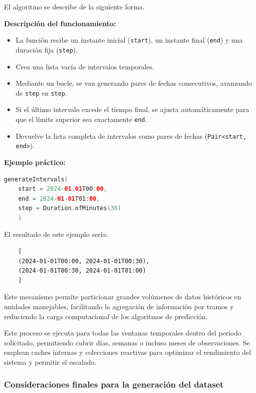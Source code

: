 El algoritmo se describe de la siguiente forma.

\vspace{1em}
\noindent \textbf{Descripción del funcionamiento:}
\begin{itemize}
	\item La función recibe un instante inicial (\texttt{start}), un instante final (\texttt{end}) y una duración fija (\texttt{step}).
	\item Crea una lista vacía de intervalos temporales.
	\item Mediante un bucle, se van generando pares de fechas consecutivos, avanzando de \texttt{step} en \texttt{step}.
	\item Si el último intervalo excede el tiempo final, se ajusta automáticamente para que el límite superior sea exactamente \texttt{end}.
	\item Devuelve la lista completa de intervalos como pares de fechas (\texttt{Pair<start, end>}).
\end{itemize}

\vspace{1em}
\noindent \textbf{Ejemplo práctico:}
\begin{lstlisting}[language=Kotlin, caption={Ejemplo de uso con intervalos de 30 minutos}]
	generateIntervals(
	start = 2024-01-01T00:00,
	end = 2024-01-01T01:00,
	step = Duration.ofMinutes(30)
	)
\end{lstlisting}

\noindent El resultado de este ejemplo sería:
\begin{verbatim}
	[
	(2024-01-01T00:00, 2024-01-01T00:30),
	(2024-01-01T00:30, 2024-01-01T01:00)
	]
\end{verbatim}

Este mecanismo permite particionar grandes volúmenes de datos históricos en unidades manejables, facilitando la agregación de información por tramos y reduciendo la carga computacional de los algoritmos de predicción.

Este proceso se ejecuta para todas las ventanas temporales dentro del periodo solicitado, permitiendo cubrir días, semanas o incluso meses de observaciones. Se emplean caches internas y colecciones reactivas para optimizar el rendimiento del sistema y permitir el escalado.

\subsubsection*{Consideraciones finales para la generación del dataset}

